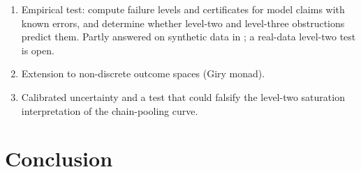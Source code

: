 \documentclass[11pt]{article}
\theoremstyle{definition}
\theoremstyle{remark}
\newcommand{\D}{\mathsf{D}}
\begin{document}
\begin{enumerate}[leftmargin=*]
  transport distances on $\D B$ and $\D^2B$, whose Kantorovich duals would give graded certificates. The level-two
  case is done in \cite[Lemma~52.1]{Awasthi-ThreeLayers}; level three is open.
\item Empirical test: compute failure levels and certificates for model claims with known errors, and
  determine whether level-two and level-three obstructions predict them. Partly answered on synthetic data in
  \cite[Sections~51.5 and~52]{Awasthi-ThreeLayers}; a real-data level-two test is open.
\item Extension to non-discrete outcome spaces (Giry monad).
\item Calibrated uncertainty and a test that could falsify the level-two saturation interpretation of
  the chain-pooling curve.
\end{enumerate}

\section{Conclusion}
\end{document}

